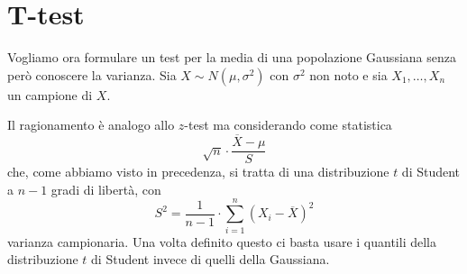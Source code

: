 \section{T-test}
Vogliamo ora formulare un test per la media di una popolazione Gaussiana senza però conoscere la
varianza. Sia $X \sim N(\mu, \sigma^2)$ con $\sigma^2$ non noto e sia $X_1, \dots, X_n$ un campione
\iid di $X$.

Il ragionamento è analogo allo $z$-test ma considerando come statistica
\[ \sqrt{n} \cdot \frac{\overline{X} - \mu}{S} \]
che, come abbiamo visto in precedenza, si tratta di una distribuzione $t$ di Student a $n-1$ gradi
di libertà, con
\[ S^2 = \frac{1}{n-1} \cdot \sum_{i=1}^n (X_i - \overline{X})^2 \]
varianza campionaria. Una volta definito questo ci basta usare i quantili della distribuzione $t$
di Student invece di quelli della Gaussiana.